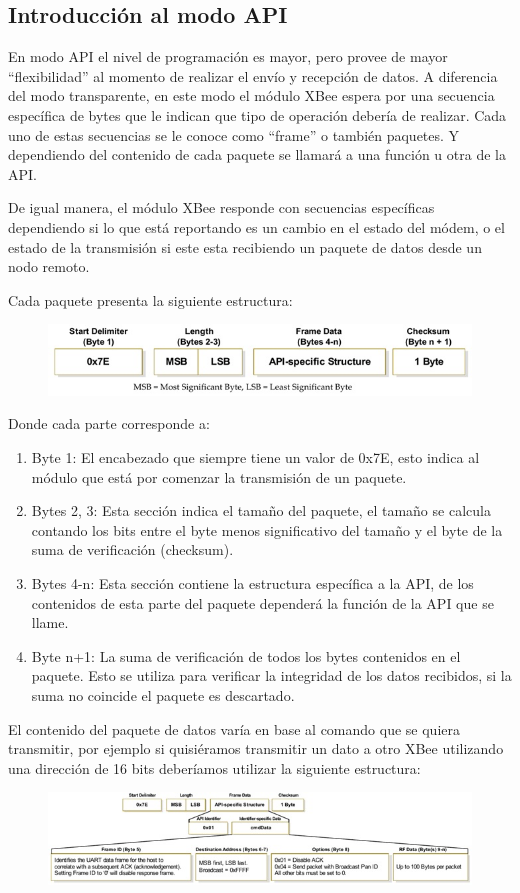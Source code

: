 \documentclass[11pt,oneside,spanish,a4paper]{article}
\begin{document}
\subsection{Introducción al modo API}
En modo API el nivel de programación es mayor, pero provee de mayor
``flexibilidad'' al momento de realizar el envío y recepción de datos.
A diferencia del modo transparente, en este modo el módulo XBee espera
por una secuencia específica de bytes que le indican que tipo de
operación debería de realizar. Cada uno de estas secuencias se le
conoce como ``frame'' o también paquetes. Y dependiendo del contenido de
cada paquete se llamará a una función u otra de la API.

De igual manera, el módulo XBee responde con secuencias específicas
dependiendo si lo que está reportando es un cambio en el estado del
módem, o el estado de la transmisión si este esta recibiendo un
paquete de datos desde un nodo remoto.

Cada paquete presenta la siguiente estructura:
\begin{figure}[ht]
	\centering
	\includegraphics[width=.6\textwidth]{img/IMAGEN05.jpg}
\end{figure}
Donde cada parte corresponde a:

\begin{enumerate}
\item Byte 1: El encabezado que siempre tiene un valor de 0x7E,
  esto indica al módulo que está por comenzar la transmisión de un
  paquete.
\item Bytes 2, 3: Esta sección indica el tamaño del paquete, el
  tamaño se calcula contando los bits entre el byte menos
  significativo del tamaño y el byte de la suma de verificación
  (checksum).
\item Bytes 4-n: Esta sección contiene la estructura específica a
  la API, de los contenidos de esta parte del paquete dependerá la
  función de la API que se llame.
\item Byte n+1: La suma de verificación de todos los bytes
  contenidos en el paquete. Esto se utiliza para verificar la
  integridad de los datos recibidos, si la suma no coincide el
  paquete es descartado.
\end{enumerate}

El contenido del paquete de datos varía en base al comando que se quiera transmitir, por ejemplo si quisiéramos transmitir un dato a otro XBee utilizando una dirección de 16 bits deberíamos utilizar la siguiente estructura:
\begin{figure}[ht]
	\centering
	\includegraphics[width=.6\textwidth]{img/IMAGEN06.jpg}
\end{figure}
\end{document}
